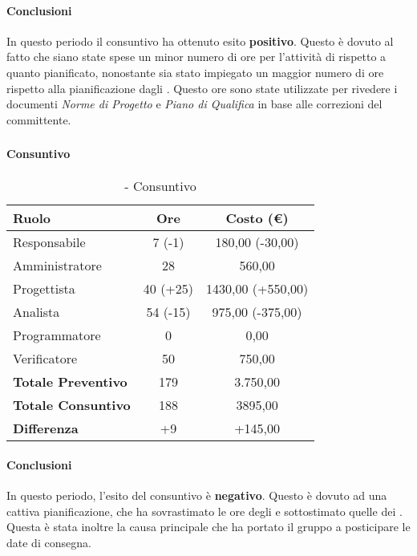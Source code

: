 \documentclass[./PianoDiProgetto.tex]{subfiles}
\begin{document}
	\paragraph{Conclusioni}
	In questo periodo il consuntivo ha ottenuto esito \textbf{positivo}. Questo è dovuto al fatto che siano state spese un minor numero di ore  per l'attività di  rispetto a quanto pianificato, nonostante sia stato impiegato un maggior numero di ore rispetto alla pianificazione dagli \AMMP{}. Questo ore sono state utilizzate per rivedere i documenti \textit{Norme di Progetto} e \textit{Piano di Qualifica} in base alle correzioni del committente.
	
\subsubsection{\PerPA}
\paragraph{Consuntivo}
	\begin{table}[h]
		\centering
		\begin{tabular}{l * {2}{c}}
			\toprule
			\textbf{Ruolo} & \textbf{Ore} & \textbf{Costo (\euro{})} \\
			\midrule
			Responsabile &	7 (-1) & 180,00 (-30,00) \\
			Amministratore & 28 & 560,00\\
			Progettista & 40 (+25) & 1430,00 (+550,00)\\
			Analista & 54 (-15)  & 975,00 (-375,00)\\
			Programmatore & 0 & 0,00 \\
			Verificatore & 50 & 750,00\\
			\midrule
			\textbf{Totale Preventivo} & 179
 & 3.750,00
 \\		
			\textbf{Totale Consuntivo} & 188 & 3895,00
 \\
			\midrule
			\textbf{Differenza} & +9 & +145,00 \\
			\bottomrule
		\end{tabular}
		\caption{\PerPA{} - Consuntivo}
	\end{table}	
	\paragraph{Conclusioni}
			In questo periodo, l'esito del consuntivo è \textbf{negativo}. Questo è dovuto ad una cattiva pianificazione, che ha sovrastimato le ore degli \ANP{} e sottostimato quelle dei \PJP{}. Questa è stata inoltre la causa principale che ha portato il gruppo a posticipare le date di consegna.
			
\end{document}
